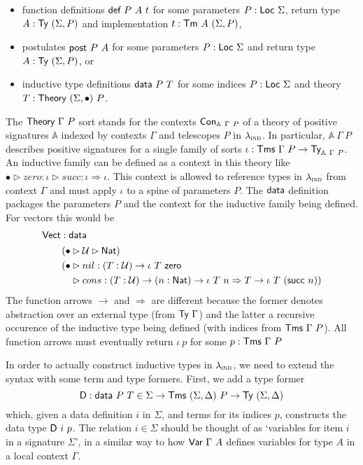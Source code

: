 \begin{itemize}
  \item function definitions $\mta{def}\ P\ A\ t$ for some parameters $P : \textsf{Loc}\
    \Sigma$, return type $A : \Ty\ (\Sigma, P)$ and implementation $t : \textsf{Tm}\ A\ (\Sigma, P)$,
  \item postulates $\textsf{post}\ P\ A$ for some parameters $P : \textsf{Loc}\
    \Sigma$ and return type $A : \Ty\ (\Sigma, P)$, or
  \item inductive type definitions $\mta{data}\ P\ T$ for some indices $P :
  \textsf{Loc}\ \Sigma$ and theory $T : \textsf{Theory}\ (\Sigma, \bullet)\ P$.
\end{itemize}

The $\textsf{Theory}\ \Gamma\ P$ sort stands for the contexts $\textsf{Con}_{\mathbb{A}\ \Gamma\
P}$ of a theory of positive signatures \cite{Kovacs2023-gq} $\mathbb{A}$ indexed
by contexts $\Gamma$ and telescopes $P$ in $\lambda_{\textsc{ind}}$. In particular,
$\mathbb{A}\ \Gamma\ P$ describes positive signatures for a single family of
sorts $\iota : \Tms\ \Gamma\ P \to \Ty_{\mathbb{A}\ \Gamma\ P}$. An inductive
family can be defined as a context in this theory like $\bullet \rhd zero :
\iota \rhd succ:\iota \Rightarrow \iota$. This context is allowed to reference
types in $\lambda_{\textsc{ind}}$ from context $\Gamma$ and must apply $\iota$ to a spine of
parameters $P$. The $\textsf{data}$ definition packages the parameters $P$ and the
context for the inductive family being defined. For vectors this would be
\begin{align*}
&\textsf{Vect} : \textsf{data} \\
&\quad\begin{aligned}
  \quad (\bullet&\rhd\mathcal{U} \rhd \textsf{Nat})\ \\
  \quad (\bullet&\rhd nil : (T : \mathcal{U}) \to \iota\ T\ \textsf{zero}  \\
  \quad         &\rhd cons : (T : \mathcal{U}) \to (n : \textsf{Nat}) \to \iota\ T\ n \Rightarrow T \to \iota\ T\ (\textsf{succ}\ n))
\end{aligned}
\end{align*}
The function arrows $\to$ and $\Rightarrow$ are different because the former
denotes abstraction over an external type (from $\textsf{Ty}\ \Gamma$) and the latter a
recursive occurence of the inductive type being defined (with indices from
$\textsf{Tms}\ \Gamma\ P$). All function arrows must eventually return $\iota\ p$ for
some $p : \textsf{Tms}\ \Gamma\ P$ 

In order to actually construct inductive types in $\lambda_{\textsc{ind}}$, we need to
extend the syntax with some term and type formers. First, we add a type former
\[
\mta{D} : \mta{data}\ P\ T \in \Sigma \to \Tms\ (\Sigma, \Delta)\ P \to \Ty\ (\Sigma, \Delta)
\]
which, given a data definition $i$ in $\Sigma$, and terms for its
indices $p$, constructs the data type $\mta{D}\ i\ p$. The relation $i \in
\Sigma$ should be thought of as `variables for item $i$ in a signature
$\Sigma$', in a similar way to how $\mta{Var}\ \Gamma\ A$ defines variables for
type $A$ in a local context $\Gamma$.

